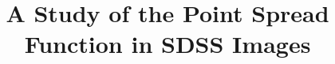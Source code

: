 \documentclass{aastex62}
\begin{document}
\title{A Study of the Point Spread Function in SDSS Images}  


\end{document}
